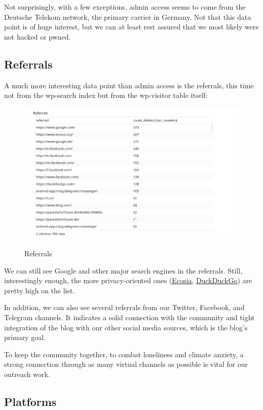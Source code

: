 Not surprisingly, with a few exceptions, admin access seems to come from the Deutsche Telekom network, the primary carrier in Germany. Not that this data point is of huge interest, but we can at least rest assured that we most likely were not hacked or pwned.

\subsection{Referrals}

A much more interesting data point than admin access is the referrals, this time not from the wp-search index but from the wp-visitor table itself:

\begin{figure}[H]
\centering
\caption {Referrals}
\includegraphics[width=\linewidth]{images/figure07.png}
\label{fig:referrals}
\end{figure}

We can still see Google and other major search engines in the referrals. Still, interestingly enough, the more privacy-oriented ones (\href{https://www.ecosia.org/?c=en}{Ecosia}, \href{https://duckduckgo.com/}{DuckDuckGo}) are pretty high on the list. 

In addition, we can also see several referrals from our Twitter, Facebook, and Telegram channels. It indicates a solid connection with the community and tight integration of the blog with our other social media sources, which is the blog's primary goal.

To keep the community together, to combat loneliness and climate anxiety, a strong connection through as many virtual channels as possible is vital for our outreach work.

\subsection{Platforms}


